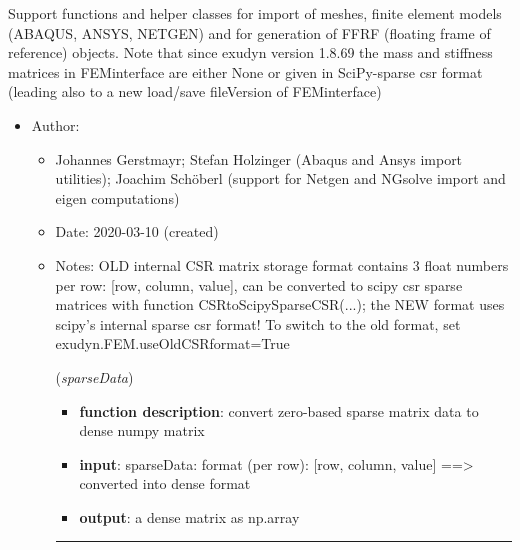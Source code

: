 \begin{itemize}[leftmargin=1.4cm]
\begin{itemize}[leftmargin=1.4cm]
\begin{itemize}[leftmargin=1.4cm]
\begin{itemize}[leftmargin=0.5cm]
\begin{itemize}[leftmargin=1.4cm]
\begin{itemize}[leftmargin=1.4cm]
%
\label{sec:module:FEM}
  Support functions and helper classes for import of meshes, finite element models (ABAQUS, ANSYS, NETGEN) and for generation of FFRF (floating frame of reference) objects.
           Note that since exudyn version 1.8.69 the mass and stiffness matrices in FEMinterface are either None or given in SciPy-sparse csr format (leading also to a new load/save fileVersion of FEMinterface)
\begin{itemize}[leftmargin=1.4cm]
\setlength{\itemindent}{-1.4cm}
\item[]Author:
\vspace{-22pt}\begin{itemize}[leftmargin=0.5cm]
\setlength{\itemindent}{-0.5cm}
\item[]   Johannes Gerstmayr; Stefan Holzinger (Abaqus and Ansys import utilities); Joachim Sch\"oberl (support for Netgen and NGsolve \cite{Schoeberl1997,NGsolve2014,NGsolve2022} import and eigen computations) 
\ei
\item[]Date:      2020-03-10 (created)
\item[]Notes:     OLD internal CSR matrix storage format contains 3 float numbers per row: [row, column, value], can be converted to scipy csr sparse matrices with function CSRtoScipySparseCSR(...); the NEW format uses scipy's internal sparse csr format! To switch to the old format, set exudyn.FEM.useOldCSRformat=True
\ei
\begin{flushleft}
\label{sec:FEM:CompressedRowSparseToDenseMatrix}
({\it sparseData})
\end{flushleft}
\setlength{\itemindent}{0.7cm}
\begin{itemize}[leftmargin=0.7cm]
\item[--]
{\bf function description}: convert zero-based sparse matrix data to dense numpy matrix
\item[--]
{\bf input}: sparseData: format (per row): [row, column, value] ==> converted into dense format
\item[--]
{\bf output}: a dense matrix as np.array
\vspace{12pt}\end{itemize}
%
\noindent\rule{8cm}{0.75pt}\vspace{1pt} \\ 
\begin{flushleft}
\label{sec:FEM:MapSparseMatrixIndices}

\end{flushleft}
\end{itemize}
\end{itemize}
\end{itemize}
\end{itemize}
\end{itemize}
\end{itemize}
\end{itemize}
\end{itemize}
